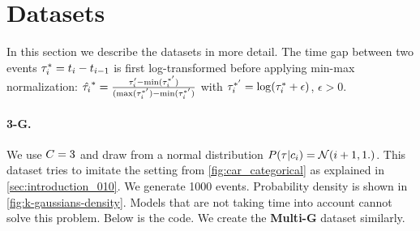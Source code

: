 \section{Datasets}\label{datasets}

In this section we describe the datasets in more detail. The time gap between two events $\tau^*_i = t_i - t_{i-1}$ is first log-transformed before applying min-max normalization: $\hat{\tau_i}^* = \frac{\tau_i' - \min(\tau_i^{*'})}{(\max(\tau_i^{*'}) - \min(\tau_i^{*'})}$ with $\tau_i^{*'} = \log(\tau_i^* + \epsilon)$, $\epsilon > 0$.

\paragraph{3-G.} We use $C=3$ and draw from a normal distribution  $P(\tau | c_i) = \mathcal{N}(i + 1, 1.)$. This dataset tries to imitate the setting from \cref{fig:car_categorical} as explained in \cref{sec:introduction_010}. We generate 1000 events. Probability density is shown in \cref{fig:k-gaussians-density}. Models that are not taking time into account cannot solve this problem. Below is the code. We create the \textbf{Multi-G} dataset similarly.\vfill

